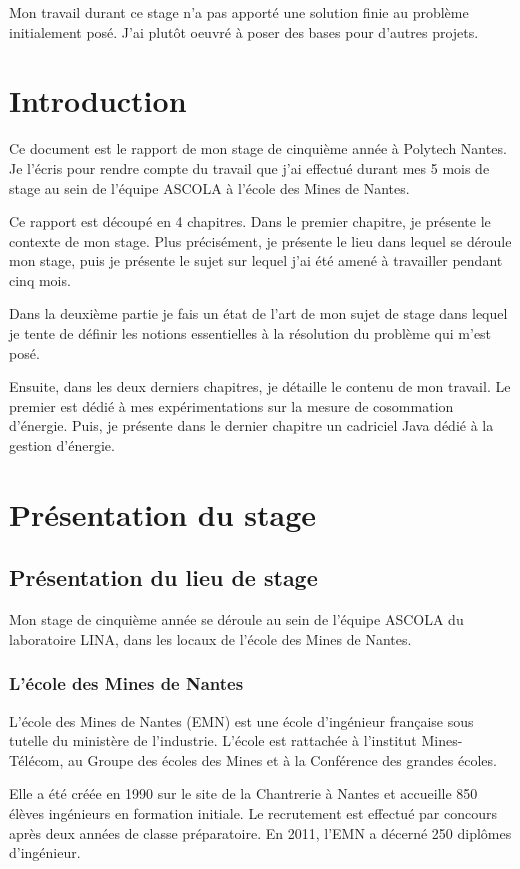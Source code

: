\documentclass[a4paper, 11pt]{report}
\begin{document}
Mon travail durant ce stage n'a pas apporté une solution finie au problème initialement posé. J'ai plutôt oeuvré à poser des bases pour d'autres projets.
\newpage

\tableofcontents

\chapter{Introduction}
Ce document est le rapport de mon stage de cinquième année à Polytech Nantes. Je l'écris pour rendre compte du travail que j'ai effectué durant mes 5 mois de stage au sein de l'équipe ASCOLA à l'école des Mines de Nantes.

Ce rapport est découpé en 4 chapitres. Dans le premier chapitre, je présente le contexte de mon stage. Plus précisément, je présente le lieu dans lequel se déroule mon stage, puis je présente le sujet sur lequel j'ai été amené à travailler pendant cinq mois.

Dans la deuxième partie je fais un état de l'art de mon sujet de stage dans lequel je tente de définir les notions essentielles à la résolution du problème qui m'est posé.

Ensuite, dans les deux derniers chapitres, je détaille le contenu de mon travail. Le premier est dédié à mes expérimentations sur la mesure de cosommation d'énergie. Puis, je présente dans le dernier chapitre un cadriciel Java dédié à la gestion d'énergie.

\chapter{Présentation du stage}
	\section{Présentation du lieu de stage}
Mon stage de cinquième année se déroule au sein de l’équipe ASCOLA du laboratoire LINA, dans les locaux de l’école des Mines de Nantes.
		\subsection{L'école des Mines de Nantes}
L’école des Mines de Nantes (EMN) est une école d’ingénieur française sous tutelle du ministère de l’industrie. L’école est rattachée à l’institut Mines-Télécom, au Groupe des écoles des Mines et à la Conférence des grandes écoles.

Elle a été créée en 1990 sur le site de la Chantrerie à Nantes et accueille 850 élèves ingénieurs en formation initiale. Le recrutement est effectué par concours après deux années de classe préparatoire. En 2011, l’EMN a décerné 250 diplômes d’ingénieur.
\end{document}
